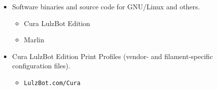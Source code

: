 \begin{itemize}
\item Software binaries and source code for GNU/Linux and others.
\begin{itemize} %
\item Cura LulzBot Edition
\item Marlin
\end{itemize} %

\item Cura LulzBot Edition Print Profiles (vendor- and filament-specific configuration files).
\begin{itemize} %
\item \texttt{LulzBot.com/Cura}
\end{itemize} %

\end{itemize}

